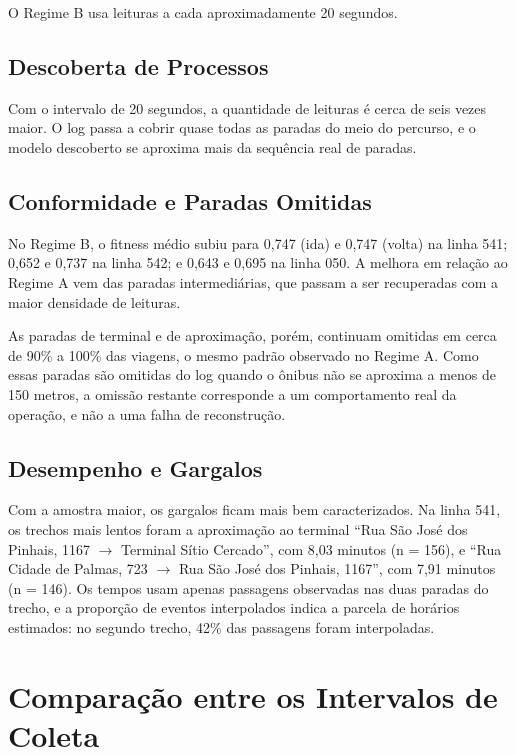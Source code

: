 O Regime B usa leituras a cada aproximadamente 20 segundos.

\subsection{Descoberta de Processos}\label{subsec:regimeB_descoberta}

Com o intervalo de 20 segundos, a quantidade de leituras é cerca de seis vezes maior. O log passa a cobrir quase todas as paradas do meio do percurso, e o modelo descoberto se aproxima mais da sequência real de paradas.

\subsection{Conformidade e Paradas Omitidas}\label{subsec:regimeB_conformidade}

No Regime B, o fitness médio subiu para 0,747 (ida) e 0,747 (volta) na linha 541; 0,652 e 0,737 na linha 542; e 0,643 e 0,695 na linha 050. A melhora em relação ao Regime A vem das paradas intermediárias, que passam a ser recuperadas com a maior densidade de leituras.

As paradas de terminal e de aproximação, porém, continuam omitidas em cerca de 90\% a 100\% das viagens, o mesmo padrão observado no Regime A. Como essas paradas são omitidas do log quando o ônibus não se aproxima a menos de 150 metros, a omissão restante corresponde a um comportamento real da operação, e não a uma falha de reconstrução.

\subsection{Desempenho e Gargalos}\label{subsec:regimeB_desempenho}

Com a amostra maior, os gargalos ficam mais bem caracterizados. Na linha 541, os trechos mais lentos foram a aproximação ao terminal ``Rua São José dos Pinhais, 1167 $\rightarrow$ Terminal Sítio Cercado'', com 8,03 minutos (n = 156), e ``Rua Cidade de Palmas, 723 $\rightarrow$ Rua São José dos Pinhais, 1167'', com 7,91 minutos (n = 146). Os tempos usam apenas passagens observadas nas duas paradas do trecho, e a proporção de eventos interpolados indica a parcela de horários estimados: no segundo trecho, 42\% das passagens foram interpoladas.

\section{Comparação entre os Intervalos de Coleta}\label{sec:comparacaoIntervalos}

